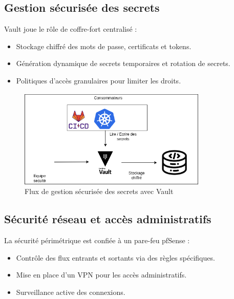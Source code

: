 \subsection{Gestion sécurisée des secrets}

Vault joue le rôle de coffre-fort centralisé :
\begin{itemize}
	\item Stockage chiffré des mots de passe, certificats et tokens.
	\item Génération dynamique de secrets temporaires et rotation de secrets.
	\item Politiques d’accès granulaires pour limiter les droits.
\end{itemize}

\begin{figure}[H]
	\centering
	\includegraphics[width=0.8\textwidth]{figures/vault-gestion-secrets.png}
	\caption{Flux de gestion sécurisée des secrets avec Vault}
\end{figure}

\subsection{Sécurité réseau et accès administratifs}

La sécurité périmétrique est confiée à un pare-feu pfSense :
\begin{itemize}
	\item Contrôle des flux entrants et sortants via des règles spécifiques.
	\item Mise en place d’un VPN pour les accès administratifs.
	\item Surveillance active des connexions.
\end{itemize}


